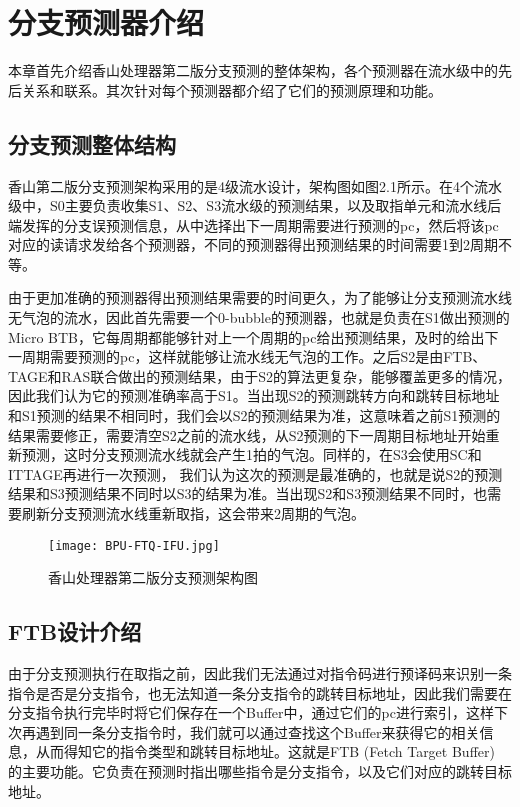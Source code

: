 \chapter{分支预测器介绍}


本章首先介绍香山处理器第二版分支预测的整体架构，各个预测器在流水级中的先后关系和联系。其次针对每个预测器都介绍了它们的预测原理和功能。

\section{分支预测整体结构}

香山第二版分支预测架构采用的是4级流水设计，架构图如图2.1所示。在4个流水级中，S0主要负责收集S1、S2、S3流水级的预测结果，以及取指单元和流水线后端发挥的分支误预测信息，从中选择出下一周期需要进行预测的pc，然后将该pc对应的读请求发给各个预测器，不同的预测器得出预测结果的时间需要1到2周期不等。

由于更加准确的预测器得出预测结果需要的时间更久，为了能够让分支预测流水线无气泡的流水，因此首先需要一个0-bubble的预测器，也就是负责在S1做出预测的Micro BTB，它每周期都能够针对上一个周期的pc给出预测结果，及时的给出下一周期需要预测的pc，这样就能够让流水线无气泡的工作。之后S2是由FTB、TAGE和RAS联合做出的预测结果，由于S2的算法更复杂，能够覆盖更多的情况，因此我们认为它的预测准确率高于S1。当出现S2的预测跳转方向和跳转目标地址和S1预测的结果不相同时，我们会以S2的预测结果为准，这意味着之前S1预测的结果需要修正，需要清空S2之前的流水线，从S2预测的下一周期目标地址开始重新预测，这时分支预测流水线就会产生1拍的气泡。同样的，在S3会使用SC和ITTAGE再进行一次预测， 我们认为这次的预测是最准确的，也就是说S2的预测结果和S3预测结果不同时以S3的结果为准。当出现S2和S3预测结果不同时，也需要刷新分支预测流水线重新取指，这会带来2周期的气泡。

\begin{figure}[htb]
	\centering
	\setlength\tabcolsep{3pt}  %
	\vspace{5pt} %
	\texttt{[image: BPU-FTQ-IFU.jpg]}
	\caption{香山处理器第二版分支预测架构图}
	\label{fig:figure1}
\end{figure}

\section{FTB设计介绍}

由于分支预测执行在取指之前，因此我们无法通过对指令码进行预译码来识别一条指令是否是分支指令，也无法知道一条分支指令的跳转目标地址，因此我们需要在分支指令执行完毕时将它们保存在一个Buffer中，通过它们的pc进行索引，这样下次再遇到同一条分支指令时，我们就可以通过查找这个Buffer来获得它的相关信息，从而得知它的指令类型和跳转目标地址。这就是FTB (Fetch Target Buffer) 的主要功能。它负责在预测时指出哪些指令是分支指令，以及它们对应的跳转目标地址。

